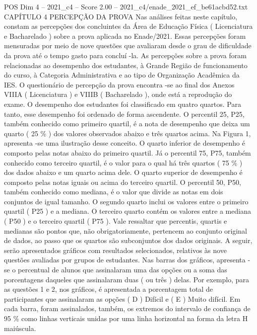 \begin{textsample}{POS Dim 4 – 2021\_c4 – Score 2.00 – 2021\_c4/enade\_2021\_ef\_be61acbd52.txt}  \label{ex:f4_pos_131}
CAPÍTULO 4 PERCEPÇÃO DA PROVA Nas análises feitas neste capítulo, constam as percepções dos concluintes da Área de Educação Física ( Licenciatura e Bacharelado ) sobre a prova aplicada no Enade/2021.
Essas percepções foram mensuradas por meio de nove questões que avaliaram desde o grau de dificuldade da prova até o tempo gasto para concluí -la.
As percepções sobre a prova foram relacionadas ao desempenho dos estudantes, à Grande Região de funcionamento do curso, à Categoria Administrativa e ao tipo de Organização Acadêmica da IES.
O questionário de percepção da prova encontra -se ao final dos Anexos VIIIA ( Licenciatura ) e VIIIB ( Bacharelado ), onde está a reprodução do exame.
O desempenho dos estudantes foi classificado em quatro quartos.
Para tanto, esse desempenho foi ordenado de forma ascendente.
O percentil 25, P25, também conhecido como primeiro quartil, é a nota de desempenho que deixa um quarto ( 25 \% ) dos valores observados abaixo e três quartos acima.
Na Figura 1, apresenta -se uma ilustração desse conceito.
O quarto inferior de desempenho é composto pelas notas abaixo do primeiro quartil.
Já o percentil 75, P75, também conhecido como terceiro quartil, é o valor para o qual há três quartos ( 75 \% ) dos dados abaixo e um quarto acima dele.
O quarto superior de desempenho é composto pelas notas iguais ou acima do terceiro quartil.
O percentil 50, P50, também conhecido como mediana, é o valor que divide as notas em dois conjuntos de igual tamanho.
O segundo quarto inclui os valores entre o primeiro quartil ( P25 ) e a mediana.
O terceiro quarto contém os valores entre a mediana ( P50 ) e o terceiro quartil ( P75 ).
Vale ressaltar que percentis, quartis e medianas são pontos que, não obrigatoriamente, pertencem ao conjunto original de dados, ao passo que os quartos são subconjuntos dos dados originais.
A seguir, serão apresentados gráficos com resultados selecionados, relativos às nove questões avaliadas por grupos de estudantes.
Nas barras dos gráficos, apresenta -se o percentual de alunos que assinalaram uma das opções ou a soma das porcentagens daqueles que assinalaram duas ( ou três ) delas.
Por exemplo, para as questões 1 e 2, nos gráficos, é apresentada a porcentagem total de participantes que assinalaram as opções ( D ) Difícil e ( E ) Muito difícil.
Em cada barra, foram assinalados, também, os extremos do intervalo de confiança de 95 \% como linhas verticais unidas por uma linha horizontal na forma da letra H maiúscula.

\end{textsample}
